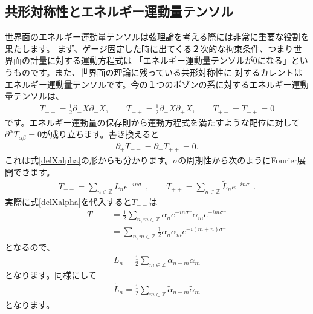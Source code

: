 \documentclass[report,paper=a4, fontsize=12pt, line_length=16cm, number_of_lines=34,dvipdfmx]{jlreq}
\numberwithin{equation}{chapter}
\numberwithin{equation}{section}
\newcommand{\Zb}{\mathbb{Z}}
\newcommand{\del}{\partial}
\newcommand{\alphat}{\tilde{\alpha}}
\newcommand{\Lt}{\widetilde{L}}
\begin{document}
\subsection{共形対称性とエネルギー運動量テンソル}
世界面のエネルギー運動量テンソルは弦理論を考える際には非常に重要な役割を果たします。
まず、ゲージ固定した時に出てくる２次的な拘束条件、つまり世界面の計量に対する運動方程式は
「エネルギー運動量テンソルが$0$になる」というものです。また、世界面の理論に残っている共形対称性に
対するカレントはエネルギー運動量テンソルです。今の１つのボゾンの系に対するエネルギー運動量テンソルは、
\begin{align}
T_{--}=\frac12 \del_{-}X\del_{-}X,\qquad
T_{++}=\frac12 \del_{+}X\del_{+}X,\qquad
T_{+-}=T_{-+}=0\label{free-scalar-EM}
\end{align}
です。エネルギー運動量の保存則から運動方程式を満たすような配位に対して$\del^{\alpha}T_{\alpha\beta}=0$が成り立ちます。書き換えると
\begin{align}
\del_{+}T_{--}=\del_{-}T_{++}=0.
\end{align}
これは式\eqref{delXalpha}の形からも分かります。$\sigma$の周期性から次のようにFourier展開できます。
\begin{align}
T_{--}=\sum_{n\in\Zb}L_{n}e^{-in\sigma^{-}},\qquad
T_{++}=\sum_{n\in\Zb}\Lt_{n}e^{-in\sigma^{+}}.
\end{align}
実際に式\eqref{delXalpha}を代入すると$T_{--}$は
\begin{align}
T_{--}&=\frac12 \sum_{n,m\in\Zb}\alpha_n e^{-in\sigma^{-}}\alpha_m e^{-im\sigma^{-}}\\
&=\sum_{n,m\in\Zb}\frac12 \alpha_n\alpha_m e^{-i(m+n)\sigma^{-}}
\end{align}
となるので、
\begin{align}
L_{n}=\frac12 \sum_{m\in\Zb} \alpha_{n-m}\alpha_{m}
\end{align}
となります。同様にして
\begin{align}
\Lt_{n}=\frac12 \sum_{m\in\Zb} \alphat_{n-m}\alphat_{m}
\end{align}
となります。
\end{document}
